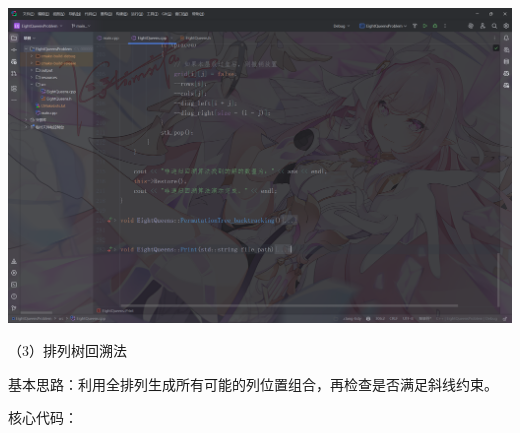 \documentclass[12pt, a4paper, oneside]{ctexart}
\begin{document}
\includegraphics[width=\textwidth]{../images/非递归回溯代码4.png}\\[0.5em]

\begin{flushleft}
\songti\fontsize{16pt}{16pt}\selectfont
（3）排列树回溯法

基本思路：利用全排列生成所有可能的列位置组合，再检查是否满足斜线约束。

核心代码：
\end{flushleft}
\end{document}
